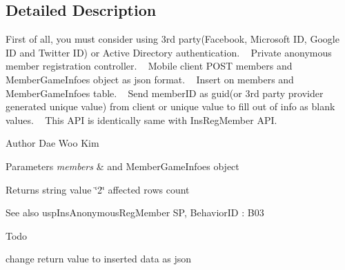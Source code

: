 \subsection{Detailed Description}
First of all, you must consider using 3rd party(\+Facebook, Microsoft I\+D, Google I\+D and Twitter I\+D) or Active Directory authentication. ~\newline
Private anonymous member registration controller. ~\newline
Mobile client P\+O\+ST members and Member\+Game\+Infoes object as json format. ~\newline
Insert on members and Member\+Game\+Infoes table. ~\newline
Send member\+ID as guid(or 3rd party provider generated unique value) from client or unique value to fill out of info as blank values. ~\newline
This A\+PI is identically same with Ins\+Reg\+Member A\+PI. 

\begin{DoxyAuthor}{Author}
Dae Woo Kim 
\end{DoxyAuthor}

\begin{DoxyParams}{Parameters}
{\em members} & and Member\+Game\+Infoes object \\
\hline
\end{DoxyParams}
\begin{DoxyReturn}{Returns}
string value \char`\"{}2\char`\"{} affected rows count 
\end{DoxyReturn}
\begin{DoxySeeAlso}{See also}
usp\+Ins\+Anonymous\+Reg\+Member SP, Behavior\+ID \+: B03 
\end{DoxySeeAlso}
\begin{DoxyRefDesc}{Todo}
\item[\hyperlink{a00001__todo000005}{Todo}]change return value to inserted data as json \end{DoxyRefDesc}
